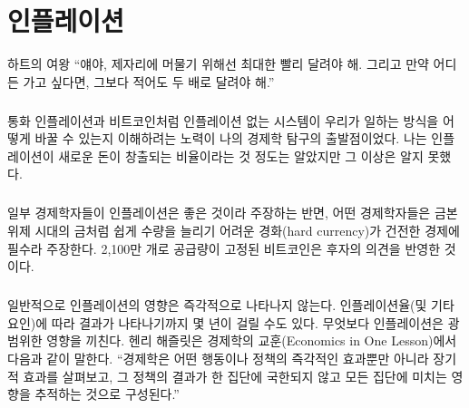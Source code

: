 \chapter{인플레이션}
\label{les:9}

\begin{chapquote}{하트의 여왕} 
	\enquote{얘야, 제자리에 머물기 위해선 최대한 빨리 달려야 해. 그리고 만약 어디든 가고 싶다면, 그보다 적어도 두 배로 달려야 해.}
\end{chapquote}

\paragraph{}
통화 인플레이션과 비트코인처럼 인플레이션 없는 시스템이 
우리가 일하는 방식을 어떻게 바꿀 수 있는지 이해하려는 노력이 나의 경제학 탐구의 출발점이었다. 
나는 인플레이션이 새로운 돈이 창출되는 비율이라는 것 정도는 알았지만 그 이상은 알지 못했다.

\paragraph{}
일부 경제학자들이 인플레이션은 좋은 것이라 주장하는 반면, 어떤 경제학자들은 금본위제 시대의 금처럼 
쉽게 수량을 늘리기 어려운 경화(hard currency)가 건전한 경제에 필수라 주장한다. 
2,100만 개로 공급량이 고정된 비트코인은 후자의 의견을 반영한 것이다.

\paragraph{}
일반적으로 인플레이션의 영향은 즉각적으로 나타나지 않는다. 
인플레이션율(및 기타 요인)에 따라 결과가 나타나기까지 몇 년이 걸릴 수도 있다. 
무엇보다 인플레이션은 광범위한 영향을 끼친다. 
헨리 해즐릿은 경제학의 교훈(Economics in One Lesson)에서 다음과 같이 말한다. 
\enquote{경제학은 어떤 행동이나 정책의 즉각적인 효과뿐만 아니라 장기적 효과를 살펴보고, 
	그 정책의 결과가 한 집단에 국한되지 않고 모든 집단에 미치는 영향을 추적하는 것으로 구성된다.}


